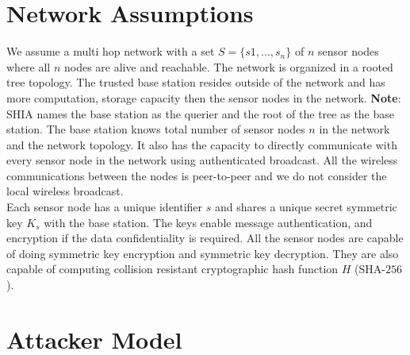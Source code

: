 \section{Network Assumptions}
	We assume a multi hop network with a set $ S = \{s1,...,s_{n}\} $ of $n$ sensor nodes where all $n$ nodes are alive and reachable. 
	The network is organized in a rooted tree topology.
	The trusted base station resides outside of the network and has more computation, storage capacity then the sensor nodes in the network. 
	\textbf{Note}: SHIA names the base station as the querier and the root of the tree as the base station. 
	The base station knows total number of sensor nodes $n$ in the network and the network topology. 
	It also has the capacity to directly communicate with every sensor node in the network using authenticated broadcast.
	All the wireless communications between the nodes is peer-to-peer and we do not consider the local wireless broadcast.\\
	Each sensor node has a unique identifier $s$ and shares a unique secret symmetric key $K_{s}$ with the base station.
	The keys enable message authentication, and encryption if the data confidentiality is required.
	All the sensor nodes are capable of doing symmetric key encryption and symmetric key decryption.
	They are also capable of computing collision resistant cryptographic hash function $H$ (SHA-$256$)\cite{SHA256}. 

\section{Attacker Model}
	
